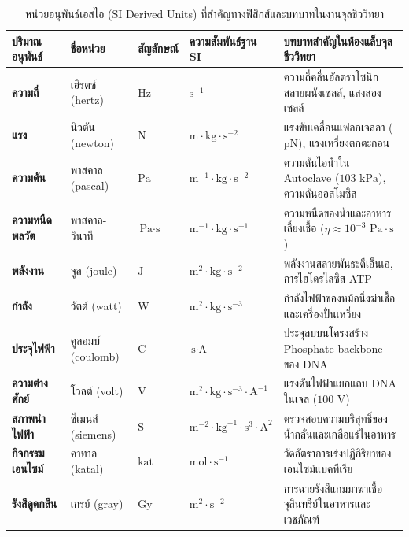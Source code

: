 \begin{table}[htbp]
\centering
\caption{หน่วยอนุพันธ์เอสไอ (SI Derived Units) ที่สำคัญทางฟิสิกส์และบทบาทในงานจุลชีววิทยา}
\label{tab:si_derived_units}
\footnotesize\setlength{\tabcolsep}{3.5pt}
\renewcommand{\arraystretch}{1.12}
\begin{tabularx}{\textwidth}{>{\bfseries}m{2.3cm} >{\centering\arraybackslash}m{2.0cm} >{\centering\arraybackslash}m{1.2cm} >{\centering\arraybackslash}m{2.0cm} >{\raggedright\arraybackslash}X}
\toprule
\textbf{ปริมาณอนุพันธ์} & \textbf{ชื่อหน่วย} & \textbf{สัญลักษณ์} & \textbf{ความสัมพันธ์ฐาน SI} & \textbf{บทบาทสำคัญในห้องแล็บจุลชีววิทยา} \\
\midrule
ความถี่ & เฮิรตซ์ (hertz) & $\text{Hz}$ & $\text{s}^{-1}$ & ความถี่คลื่นอัลตราโซนิกสลายผนังเซลล์, แสงส่องเซลล์ \\
แรง & นิวตัน (newton) & $\text{N}$ & $\text{m}\cdot\text{kg}\cdot\text{s}^{-2}$ & แรงขับเคลื่อนแฟลกเจลลา ($\text{pN}$), แรงเหวี่ยงตกตะกอน \\
ความดัน & พาสคาล (pascal) & $\text{Pa}$ & $\text{m}^{-1}\cdot\text{kg}\cdot\text{s}^{-2}$ & ความดันไอน้ำใน Autoclave ($103\text{ kPa}$), ความดันออสโมซิส \\
ความหนืดพลวัต & พาสคาล-วินาที & $\text{Pa}\cdot\text{s}$ & $\text{m}^{-1}\cdot\text{kg}\cdot\text{s}^{-1}$ & ความหนืดของน้ำและอาหารเลี้ยงเชื้อ ($\eta \approx 10^{-3}\text{ Pa}\cdot\text{s}$) \\
พลังงาน & จูล (joule) & $\text{J}$ & $\text{m}^2\cdot\text{kg}\cdot\text{s}^{-2}$ & พลังงานสลายพันธะดีเอ็นเอ, การไฮโดรไลซิส ATP \\
กำลัง & วัตต์ (watt) & $\text{W}$ & $\text{m}^2\cdot\text{kg}\cdot\text{s}^{-3}$ & กำลังไฟฟ้าของหม้อนึ่งฆ่าเชื้อและเครื่องปั่นเหวี่ยง \\
ประจุไฟฟ้า & คูลอมบ์ (coulomb) & $\text{C}$ & $\text{s}\cdot\text{A}$ & ประจุลบบนโครงสร้าง Phosphate backbone ของ DNA \\
ความต่างศักย์ & โวลต์ (volt) & $\text{V}$ & $\text{m}^2\cdot\text{kg}\cdot\text{s}^{-3}\cdot\text{A}^{-1}$ & แรงดันไฟฟ้าแยกแถบ DNA ในเจล ($100\text{ V}$) \\
สภาพนำไฟฟ้า & ซีเมนส์ (siemens) & $\text{S}$ & $\text{m}^{-2}\cdot\text{kg}^{-1}\cdot\text{s}^3\cdot\text{A}^2$ & ตรวจสอบความบริสุทธิ์ของน้ำกลั่นและเกลือแร่ในอาหาร \\
กิจกรรมเอนไซม์ & คาทาล (katal) & $\text{kat}$ & $\text{mol}\cdot\text{s}^{-1}$ & วัดอัตราการเร่งปฏิกิริยาของเอนไซม์แบคทีเรีย \\
รังสีดูดกลืน & เกรย์ (gray) & $\text{Gy}$ & $\text{m}^2\cdot\text{s}^{-2}$ & การฉายรังสีแกมมาฆ่าเชื้อจุลินทรีย์ในอาหารและเวชภัณฑ์ \\
\bottomrule
\end{tabularx}
\end{table}

